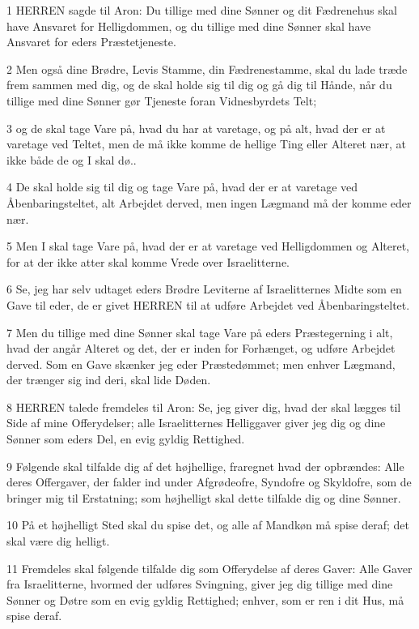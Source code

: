 \par 1 HERREN sagde til Aron: Du tillige med dine Sønner og dit Fædrenehus skal have Ansvaret for Helligdommen, og du tillige med dine Sønner skal have Ansvaret for eders Præstetjeneste.
\par 2 Men også dine Brødre, Levis Stamme, din Fædrenestamme, skal du lade træde frem sammen med dig, og de skal holde sig til dig og gå dig til Hånde, når du tillige med dine Sønner gør Tjeneste foran Vidnesbyrdets Telt;
\par 3 og de skal tage Vare på, hvad du har at varetage, og på alt, hvad der er at varetage ved Teltet, men de må ikke komme de hellige Ting eller Alteret nær, at ikke både de og I skal dø..
\par 4 De skal holde sig til dig og tage Vare på, hvad der er at varetage ved Åbenbaringsteltet, alt Arbejdet derved, men ingen Lægmand må der komme eder nær.
\par 5 Men I skal tage Vare på, hvad der er at varetage ved Helligdommen og Alteret, for at der ikke atter skal komme Vrede over Israelitterne.
\par 6 Se, jeg har selv udtaget eders Brødre Leviterne af Israelitternes Midte som en Gave til eder, de er givet HERREN til at udføre Arbejdet ved Åbenbaringsteltet.
\par 7 Men du tillige med dine Sønner skal tage Vare på eders Præstegerning i alt, hvad der angår Alteret og det, der er inden for Forhænget, og udføre Arbejdet derved. Som en Gave skænker jeg eder Præstedømmet; men enhver Lægmand, der trænger sig ind deri, skal lide Døden.
\par 8 HERREN talede fremdeles til Aron: Se, jeg giver dig, hvad der skal lægges til Side af mine Offerydelser; alle Israelitternes Helliggaver giver jeg dig og dine Sønner som eders Del, en evig gyldig Rettighed.
\par 9 Følgende skal tilfalde dig af det højhellige, fraregnet hvad der opbrændes: Alle deres Offergaver, der falder ind under Afgrødeofre, Syndofre og Skyldofre, som de bringer mig til Erstatning; som højhelligt skal dette tilfalde dig og dine Sønner.
\par 10 På et højhelligt Sted skal du spise det, og alle af Mandkøn må spise deraf; det skal være dig helligt.
\par 11 Fremdeles skal følgende tilfalde dig som Offerydelse af deres Gaver: Alle Gaver fra Israelitterne, hvormed der udføres Svingning, giver jeg dig tillige med dine Sønner og Døtre som en evig gyldig Rettighed; enhver, som er ren i dit Hus, må spise deraf.
